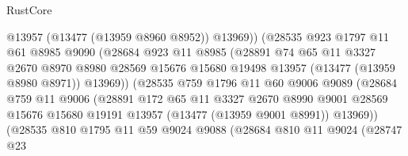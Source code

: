 \begin{lexlean}{RustCore}
\begin{coremodule}
                              @13957
                              (@13477 (@13959 @8960 @8952))
                              @13969))
                          (@28535
                            @923
                            @1797
                            @11
                            @61
                            @8985
                            @9090
                            (@28684
                              @923
                              @11
                              @8985
                              (@28891
                                @74
                                @65
                                @11
                                @3327
                                @2670
                                @8970
                                @8980
                                @28569
                                @15676
                                @15680
                                @19498
                                @13957
                                (@13477 (@13959 @8980 @8971))
                                @13969))
                            (@28535
                              @759
                              @1796
                              @11
                              @60
                              @9006
                              @9089
                              (@28684
                                @759
                                @11
                                @9006
                                (@28891
                                  @172
                                  @65
                                  @11
                                  @3327
                                  @2670
                                  @8990
                                  @9001
                                  @28569
                                  @15676
                                  @15680
                                  @19191
                                  @13957
                                  (@13477 (@13959 @9001 @8991))
                                  @13969))
                              (@28535
                                @810
                                @1795
                                @11
                                @59
                                @9024
                                @9088
                                (@28684
                                  @810
                                  @11
                                  @9024
                                  (@28747
                                    @23

\end{coremodule}
\end{lexlean}
